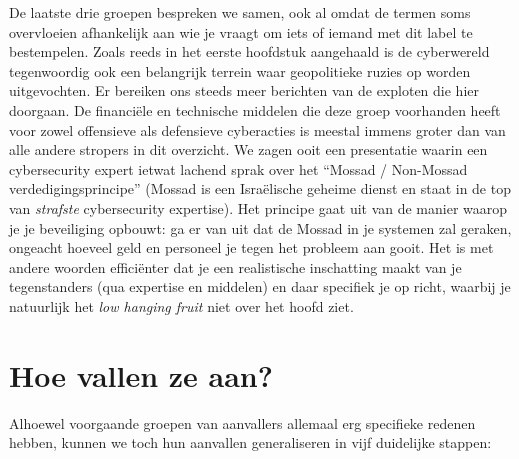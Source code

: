 \documentclass[
  10pt,
  dutch,
  paper=a4,
  ,captions=tableheading
]{scrbook}
\begin{document}
De laatste drie groepen bespreken we samen, ook al omdat de termen soms
overvloeien afhankelijk aan wie je vraagt om iets of iemand met dit
label te bestempelen. Zoals reeds in het eerste hoofdstuk aangehaald is
de cyberwereld tegenwoordig ook een belangrijk terrein waar geopolitieke
ruzies op worden uitgevochten. Er bereiken ons steeds meer berichten van
de exploten die hier doorgaan. De financiële en technische middelen die
deze groep voorhanden heeft voor zowel offensieve als defensieve
cyberacties is meestal immens groter dan van alle andere stropers in dit
overzicht. We zagen ooit een presentatie waarin een cybersecurity expert
ietwat lachend sprak over het ``Mossad / Non-Mossad
verdedigingsprincipe'' (Mossad is een Israëlische geheime dienst en
staat in de top van \emph{strafste} cybersecurity expertise). Het
principe gaat uit van de manier waarop je je beveiliging opbouwt: ga er
van uit dat de Mossad in je systemen zal geraken, ongeacht hoeveel geld
en personeel je tegen het probleem aan gooit. Het is met andere woorden
efficiënter dat je een realistische inschatting maakt van je
tegenstanders (qua expertise en middelen) en daar specifiek je op richt,
waarbij je natuurlijk het \emph{low hanging fruit} niet over het hoofd
ziet.

\section{Hoe vallen ze aan?}\label{hoe-vallen-ze-aan}

Alhoewel voorgaande groepen van aanvallers allemaal erg specifieke
redenen hebben, kunnen we toch hun aanvallen generaliseren in vijf
duidelijke stappen:
\end{document}
